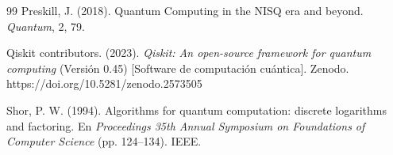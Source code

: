 \documentclass[11pt,a4paper,spanish]{book}
\begin{document}
\begin{thebibliography}{99}
Preskill, J. (2018). Quantum Computing in the NISQ era and beyond. \emph{Quantum}, 2, 79.

Qiskit contributors. (2023). \emph{Qiskit: An open-source framework for quantum computing} (Versión 0.45) [Software de computación cuántica]. Zenodo. https://doi.org/10.5281/zenodo.2573505

Shor, P. W. (1994). Algorithms for quantum computation: discrete logarithms and factoring. En \emph{Proceedings 35th Annual Symposium on Foundations of Computer Science} (pp. 124--134). IEEE.

\end{thebibliography}
\end{document}
